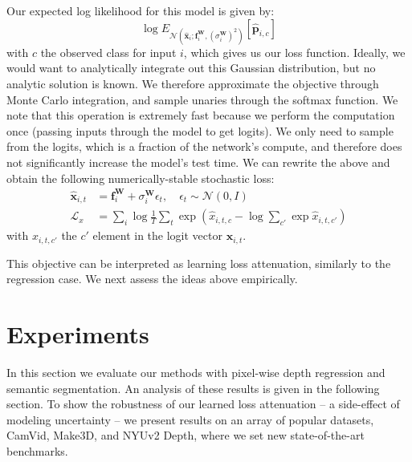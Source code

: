 \documentclass{article}
\newcommand{\N}{\mathcal{N}}
\newcommand{\cL}{\mathcal{L}}
\newcommand{\f}{\mathbf{f}}
\newcommand{\x}{\mathbf{x}}
\newcommand{\W}{\mathbf{W}}
\newcommand{\p}{\mathbf{p}}
\begin{document}
Our expected log likelihood for this model is given by:
\begin{equation}
\log E_{\N(\hat{\x}_i; \f^\W_i, (\sigma_i^\W)^2)}[\hat{\p}_{i,c}]
\end{equation}
with $c$ the observed class for input $i$,
which gives us our loss function.
Ideally, we would want to analytically integrate out this Gaussian distribution, but no analytic solution is known.
We therefore approximate the objective through Monte Carlo integration, and sample unaries through the softmax function.
We note that this operation is extremely fast because we perform the computation once (passing inputs through the model to get logits). We only need to sample from the logits, which is a fraction of the network's compute, and therefore does not significantly increase the model's test time. 
We can rewrite the above and obtain the following numerically-stable stochastic loss:
\begin{equation}
\begin{split}
\hat{\x}_{i,t} &= \f^\W_i + \sigma_i^\W \epsilon_t, \quad \epsilon_t \sim \mathcal{N}(0,I)
\\
\cL_x &= \sum_{i} \log \frac{1}{T} \sum_{t} \exp (\hat{x}_{i,t,c} - \log \sum_{c'} \exp \hat{x}_{i,t,c'}) 
\end{split}
\label{eqn:aleatoric_classification_loss}
\end{equation}
with $x_{i,t,c'}$ the $c'$ element in the logit vector $\x_{i,t}$. 

This objective can be interpreted as learning loss attenuation, similarly to the regression case. We next assess the ideas above empirically.














\section{Experiments}
\label{sec:results}

In this section we evaluate our methods with pixel-wise depth regression and semantic segmentation. An analysis of these results is given in the following section. To show the robustness of our learned loss attenuation -- a side-effect of modeling uncertainty -- we present results on an array of popular datasets, CamVid, Make3D, and NYUv2 Depth, where we set new state-of-the-art benchmarks.
\end{document}
